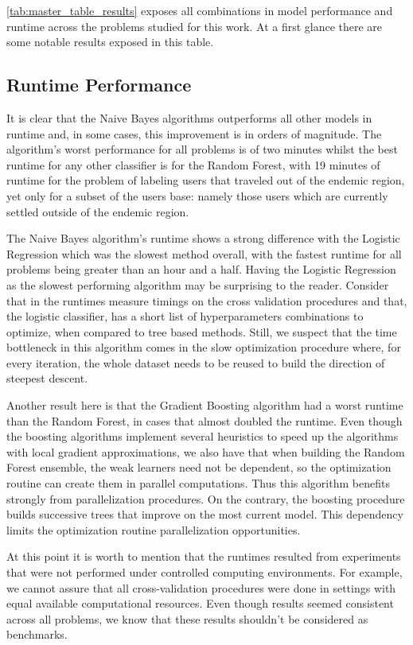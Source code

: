 \cref{tab:master_table_results} exposes all combinations in model performance and runtime across the problems studied for this work.
At a first glance there are some notable results exposed in this table.

\subsection{Runtime Performance}\label{subsec:master_table_runtime}

It is clear that the Naive Bayes algorithms outperforms all other models in runtime and, in some cases, this improvement is in orders of magnitude.
The algorithm's worst performance for all problems is of two minutes whilst the best runtime for any other classifier is for the Random Forest, with 19 minutes of runtime for the problem of labeling users that traveled out of the endemic region, yet only for a subset of the users base: namely those users which are currently settled outside of the endemic region.

The Naive Bayes algorithm's runtime shows a strong difference with the Logistic Regression which was the slowest method overall, with the fastest runtime for all problems being greater than an hour and a half.
Having the Logistic Regression as the slowest performing algorithm may be surprising to the reader.
Consider that in the runtimes measure timings on the cross validation procedures and that, the logistic classifier, has a short list of hyperparameters combinations to optimize, when compared to tree based methods.
Still, we suspect that the time bottleneck in this algorithm comes in the slow optimization procedure where, for every iteration, the whole dataset needs to be reused to build the direction of steepest descent.

Another result here is that the Gradient Boosting algorithm had a worst runtime than the Random Forest, in cases that almost doubled the runtime.
Even though the boosting algorithms implement several heuristics to speed up the algorithms with local gradient approximations, we also have that when building the Random Forest ensemble, the weak learners need not be dependent, so the optimization routine can create them in parallel computations.
Thus this algorithm benefits strongly from parallelization procedures.
On the contrary, the boosting procedure builds successive trees that improve on the most current model.
This dependency limits the optimization routine parallelization opportunities.

At this point it is worth to mention that the runtimes resulted from experiments that were not performed under controlled computing environments.
For example, we cannot assure that all cross-validation procedures were done in settings with equal available computational resources.
Even though results seemed consistent across all problems, we know that these results shouldn't be considered as benchmarks.


